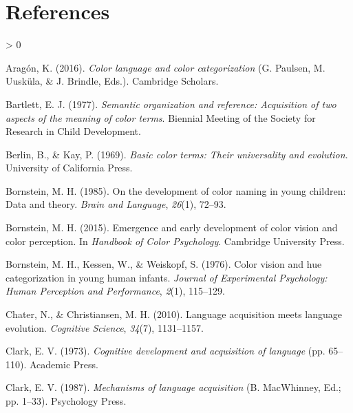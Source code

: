 \documentclass[
  english,
  ,apa7,floatsintext]{apa6}
\newlength{\cslhangindent}
\newenvironment{CSLReferences}[2] %
 {%
  \setlength{\parindent}{0pt}
  \ifodd #1 \everypar{\setlength{\hangindent}{\cslhangindent}}\ignorespaces\fi
  \ifnum #2 > 0
  \setlength{\parskip}{#2\baselineskip}
  \fi
 }%
 {}
\begin{document}
\newpage

\hypertarget{references}{%
\section{References}\label{references}}

\begingroup
\setlength{\parindent}{-0.5in}
\setlength{\leftskip}{0.5in}

\hypertarget{refs}{}
\begin{CSLReferences}{1}{0}
\leavevmode\hypertarget{ref-aragon2016}{}%
Aragón, K. (2016). \emph{Color language and color categorization} (G. Paulsen, M. Uusküla, \& J. Brindle, Eds.). Cambridge Scholars.

\leavevmode\hypertarget{ref-bartlett1977}{}%
Bartlett, E. J. (1977). \emph{Semantic organization and reference: Acquisition of two aspects of the meaning of color terms}. Biennial Meeting of the Society for Research in Child Development.

\leavevmode\hypertarget{ref-berlin1969}{}%
Berlin, B., \& Kay, P. (1969). \emph{Basic color terms: Their universality and evolution}. University of California Press.

\leavevmode\hypertarget{ref-bornstein1985}{}%
Bornstein, M. H. (1985). On the development of color naming in young children: Data and theory. \emph{Brain and Language}, \emph{26}(1), 72--93.

\leavevmode\hypertarget{ref-bornstein2015}{}%
Bornstein, M. H. (2015). Emergence and early development of color vision and color perception. In \emph{Handbook of {C}olor {P}sychology}. Cambridge University Press.

\leavevmode\hypertarget{ref-bornstein1976}{}%
Bornstein, M. H., Kessen, W., \& Weiskopf, S. (1976). Color vision and hue categorization in young human infants. \emph{Journal of Experimental Psychology: Human Perception and Performance}, \emph{2}(1), 115--129.

\leavevmode\hypertarget{ref-chater2010}{}%
Chater, N., \& Christiansen, M. H. (2010). Language acquisition meets language evolution. \emph{Cognitive Science}, \emph{34}(7), 1131--1157.

\leavevmode\hypertarget{ref-clark1973}{}%
Clark, E. V. (1973). \emph{Cognitive development and acquisition of language} (pp. 65--110). Academic Press.

\leavevmode\hypertarget{ref-clark1987}{}%
Clark, E. V. (1987). \emph{Mechanisms of language acquisition} (B. MacWhinney, Ed.; pp. 1--33). Psychology Press.


\end{CSLReferences}
\end{document}
